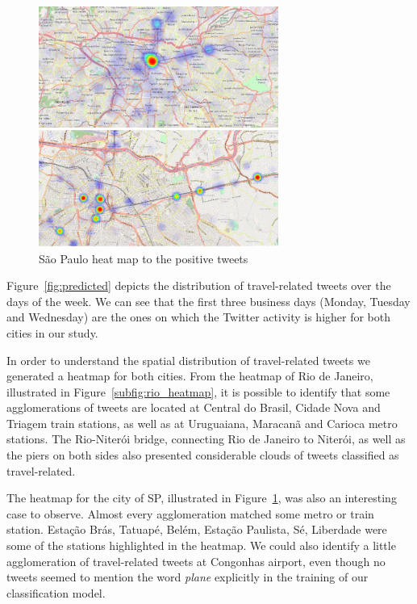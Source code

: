 \begin{figure}[!htp]
	\centering
	\includegraphics[width=0.7\textwidth]{figures/sp_1}
	\caption{São Paulo heat map to the positive tweets}
	\label{subfig:sp_heatmap}
\end{figure}

Figure~\ref{fig:predicted} depicts the distribution of travel-related tweets over the days of the week. We can see that the first three business days (Monday, Tuesday and Wednesday) are the ones on which the Twitter activity is higher for both cities in our study.

In order to understand the spatial distribution of travel-related tweets we generated a heatmap for both cities. From the heatmap of Rio de Janeiro, illustrated in Figure~\ref{subfig:rio_heatmap}, it is possible to identify that some agglomerations of tweets are located at Central do Brasil, Cidade Nova and Triagem train stations, as well as at Uruguaiana, Maracanã and Carioca metro stations. The Rio-Niterói bridge, connecting Rio de Janeiro to Niterói, as well as the piers on both sides also presented considerable clouds of tweets classified as travel-related.

The heatmap for the city of SP, illustrated in Figure~\ref{subfig:sp_heatmap}, was also an interesting case to observe. Almost every agglomeration matched some metro or train station. Estação Brás, Tatuapé, Belém, Estação Paulista, Sé, Liberdade were some of the stations highlighted in the heatmap. We could also identify a little agglomeration of travel-related tweets at Congonhas airport, even though no tweets seemed to mention the word \textit{plane} explicitly in the training of our classification model.

